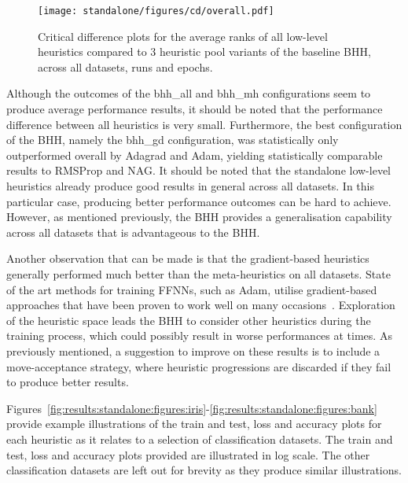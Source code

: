 \begin{figure}[htb]
	\centering
	\texttt{[image: standalone/figures/cd/overall.pdf]}
	\caption{Critical difference plots for the average ranks of all low-level heuristics compared to 3 heuristic pool variants of the baseline \acs{BHH}, across all datasets, runs and epochs.}
	\label{fig:results:standalone:descriptive:cd}
\end{figure}

Although the outcomes of the bhh\_all and bhh\_mh configurations seem to produce average performance results, it should be noted that the performance difference between all heuristics is very small. Furthermore, the best configuration of the \acs{BHH}, namely the bhh\_gd configuration, was statistically only outperformed overall by \acs{Adagrad} and \acs{Adam}, yielding statistically comparable results to \acs{RMSProp} and \acs{NAG}. It should be noted that the standalone low-level  heuristics already produce good results in general across all datasets. In this particular case, producing better performance outcomes can be hard to achieve. However, as mentioned previously, the \acs{BHH} provides a generalisation capability across all datasets that is advantageous to the \acs{BHH}.

Another observation that can be made is that the gradient-based heuristics generally performed much better than the meta-heuristics on all datasets. State of the art methods for training \acp{FFNN}, such as \acs{Adam}, utilise gradient-based approaches that have been proven to work well on many occasions~\cite{ref:kingma:2014}. Exploration of the heuristic space leads the \acs{BHH} to consider other heuristics during the training process, which could possibly result in worse performances at times. As previously mentioned, a suggestion to improve on these results is to include a move-acceptance strategy, where heuristic progressions are discarded if they fail to produce better results.

Figures~\ref{fig:results:standalone:figures:iris}-\ref{fig:results:standalone:figures:bank} provide example illustrations of the train and test, loss and accuracy plots for each heuristic as it relates to a selection of classification datasets. The train and test, loss and accuracy plots provided are illustrated in log scale. The other classification datasets are left out for brevity as they produce similar illustrations.


